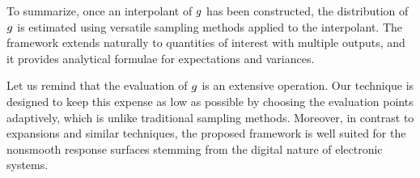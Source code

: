To summarize, once an interpolant of $g$ has been constructed, the distribution
of $g$ is estimated using versatile sampling methods applied to the
interpolant. The framework extends naturally to quantities of interest with
multiple outputs, and it provides analytical formulae for expectations and
variances.

Let us remind that the evaluation of $g$ is an extensive operation. Our
technique is designed to keep this expense as low as possible by choosing the
evaluation points adaptively, which is unlike traditional sampling methods.
Moreover, in contrast to  expansions and similar techniques, the proposed
framework is well suited for the nonsmooth response surfaces stemming from the
digital nature of electronic systems.
